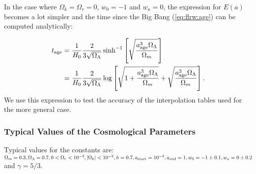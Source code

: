 In the case where $\Omega_k = \Omega_r = 0$, $w_0=-1$ and $w_a = 0$, the
expression for $E(a)$ becomes a lot simpler and the time since the Big
Bang (\ref{eq:flrw:age}) can be computed analytically:

\begin{align}
  t_{\rm age} &= \frac{1}{H_0}\frac{2}{3\sqrt{\Omega_\Lambda}} \sinh^{-1}\left[\sqrt{\frac{a_{\rm age}^3 \Omega_\Lambda}{\Omega_m}}\right] \\
              &= \frac{1}{H_0}\frac{2}{3\sqrt{\Omega_\Lambda}}
\log\left[\sqrt{1+\frac{a_{\rm age}^3 \Omega_\Lambda}{\Omega_m}} + \sqrt{\frac{a_{\rm age}^3 \Omega_\Lambda}{\Omega_m}}\right].
\end{align}
We use this expression to test the accuracy of the interpolation
tables used for the more general case.

\subsubsection{Typical Values of the Cosmological Parameters}

Typical values for the constants are: $\Omega_m = 0.3, \Omega_\Lambda=0.7, 0 <
\Omega_r<10^{-3}, |\Omega_k | < 10^{-2}, h=0.7, a_{\rm start} = 10^{-2}, a_{\rm
end} = 1, w_0 = -1\pm 0.1, w_a=0\pm0.2$ and $\gamma = 5/3$.
